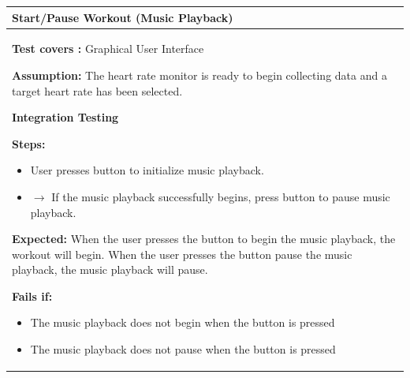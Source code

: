 \documentclass[letterpaper,english, 12pt]{scrreprt}
\begin{document}
\begin{center}
        \begin{tabular}{|C{15cm}|}
                \hline
                        \textbf{Start/Pause Workout (Music Playback)}\\
                \hline
                        \begin{flushleft}
                                \textbf{Test covers : } Graphical User Interface
                        \end{flushleft}
                        \begin{flushleft}
                                \textbf{Assumption: } The heart rate monitor is ready to begin collecting data and a target heart rate has been selected.
                        \end{flushleft}
			\begin{center}
				\textbf{Integration Testing}
			\end{center}
                        \begin{flushleft}
                                \textbf{Steps:}
                        \end{flushleft}
				\begin{itemize}
					\item User presses button to initialize music playback.
					\item $\rightarrow$ If the music playback successfully begins, press button to pause music playback.
				\end{itemize}
			\begin{flushleft}
				\textbf{Expected: } When the user presses the button to begin the music playback, the workout will begin. When the user presses the button pause the music playback, the music playback will pause.
			\end{flushleft}
                        \begin{flushleft}
                                \textbf{Fails if: }
                        \end{flushleft}
                                \begin{itemize}
                                        \item The music playback does not begin when the button is pressed
					\item The music playback does not pause when the button is pressed
                                \end{itemize}
				\\
		\hline
        \end{tabular}
\end{center}
\end{document}
